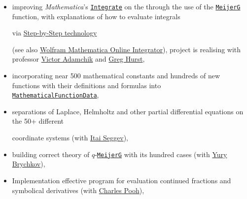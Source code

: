  \begin{itemize}

 \small

\itemsep=0mm  

\parsep=0mm 

\item[1)] improving \textit{Mathematica}'s \href{http://reference.wolfram.com/language/ref/Integrate.html}{\texttt{Integrate}} on the through the use of the \href{http://reference.wolfram.com/language/ref/MeijerG.html}{\texttt{MeijerG}} function, with explanations of how to evaluate integrals 

via \href{http://www.wolframalpha.com/pro/step-by-step-math-solver.html?src=widget}{Step-by-Step technology} 


(see also \href{http://integrals.wolfram.com/index.jsp}{Wolfram Mathematica Online Integrator}), project is realising with professor \href{http://www.cs.cmu.edu/~adamchik/}{Victor Adamchik} and \href{http://blog.wolframalpha.com/author/ghurst/}{Greg Hurst},



\item[2)]  incorporating near 500 mathematical constants and hundreds of new functions with their definitions and formulas into \href{http://reference.wolfram.com/language/ref/MathematicalFunctionData.html}{\tt MathematicalFunctionData}, 



\item[3)]  separations of Laplace, Helmholtz and other partial differential equations on the 50+ different 


coordinate systems (with \href{https://www.cs.hmc.edu/~is/}{Itai Seggev}),



\item[4)]  building correct theory of $q$-\href{http://reference.wolfram.com/language/ref/MeijerG.html}{\texttt{MeijerG}} with its hundred cases (with \href{https://www.researchgate.net/profile/Yury_Brychkov2/topics}{Yury Brychkov}), 



\item[5)]   Implementation effective program for evaluation continued fractions and symbolical derivatives (with \href{http://www.math.buffalo.edu/mad/PEEPS2/pooh_charles.html}{Charles Pooh}),






\end{itemize}
